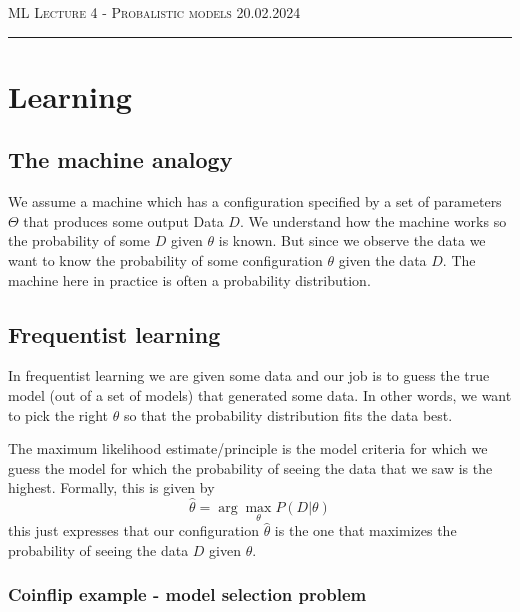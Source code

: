 \documentclass[12pt]{article}
\begin{document}
\thispagestyle{empty}

{\scshape ML } \hfill {\scshape \large Lecture 4 - Probalistic models} \hfill {\scshape 20.02.2024}
 
\smallskip
\hrule
\bigskip

\tableofcontents

\section{Learning}

\subsection{The machine analogy}

We assume a machine which has a configuration specified by a set of parameters $\Theta$ that produces some output Data $D$. We understand how the machine works so the probability of some $D$ given $\theta$ is known. But since we observe the data we want to know the probability of some configuration $\theta$ given the data $D$. The machine here in practice is often a probability distribution.

\subsection{Frequentist learning}

\begin{definition}
    In frequentist learning we are given some data and our job is to guess the true model (out of a set of models) that generated some data. In other words, we want to pick the right $\theta$ so that the probability distribution fits the data best.
\end{definition}

\begin{definition}
    The maximum likelihood estimate/principle is the model criteria for which we guess the model for which the probability of seeing the data that we saw is the highest. Formally, this is given by 
    \[
        \hat{\theta} = \arg\max_{\theta} P(D|\theta)  
    \]
    this just expresses that our configuration $\hat{\theta}$ is the one that maximizes the probability of seeing the data $D$ given $\theta$.
\end{definition}

\subsubsection*{Coinflip example - model selection problem}
\end{document}
